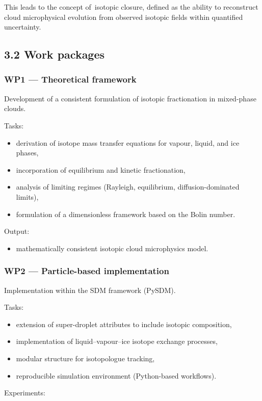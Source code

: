 \documentclass[11pt,a4paper]{article}
\begin{document}
This leads to the concept of isotopic closure, defined as the ability to reconstruct cloud microphysical evolution from observed isotopic fields within quantified uncertainty.

\subsection*{3.2 Work packages}
\subsubsection*{WP1 — Theoretical framework}
Development of a consistent formulation of isotopic fractionation in mixed-phase clouds.

Tasks:

\begin{itemize}
\item derivation of isotope mass transfer equations for vapour, liquid, and ice phases,


\item incorporation of equilibrium and kinetic fractionation,


\item analysis of limiting regimes (Rayleigh, equilibrium, diffusion-dominated limits),


\item formulation of a dimensionless framework based on the Bolin number.


\end{itemize}
Output:

\begin{itemize}
\item mathematically consistent isotopic cloud microphysics model.


\end{itemize}
\subsubsection*{WP2 — Particle-based implementation}
Implementation within the SDM framework (PySDM).

Tasks:

\begin{itemize}
\item extension of super-droplet attributes to include isotopic composition,


\item implementation of liquid–vapour–ice isotope exchange processes,


\item modular structure for isotopologue tracking,


\item reproducible simulation environment (Python-based workflows).


\end{itemize}
Experiments:
\end{document}
